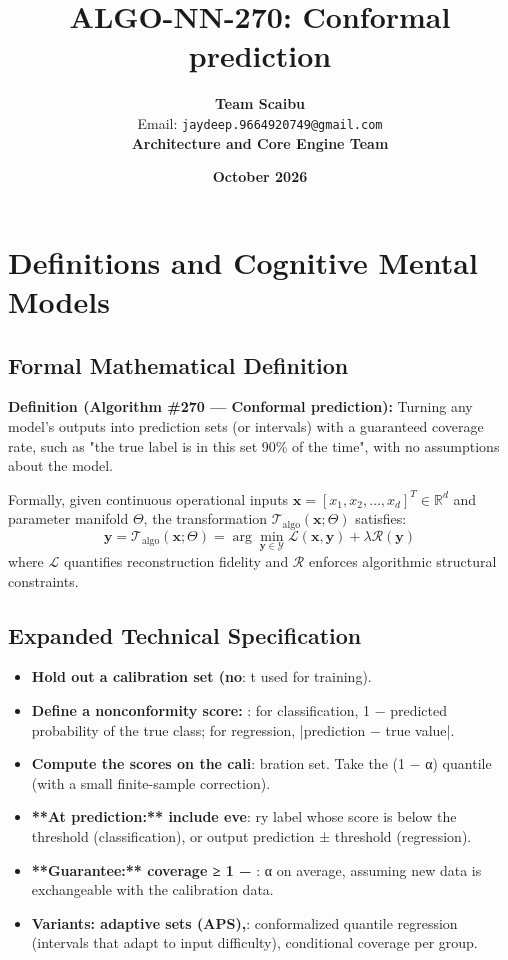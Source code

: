 \documentclass[11pt,a4paper]{article}
\title{\textbf{ALGO-NN-270: Conformal prediction}}
\author{\textbf{Team Scaibu} \\ \small Email: \texttt{jaydeep.9664920749@gmail.com} \\ \small \textbf{Architecture and Core Engine Team}}
\date{\textbf{October 2026}}
\theoremstyle{definition}
\begin{document}
\maketitle

\section{Definitions and Cognitive Mental Models}

\subsection{Formal Mathematical Definition}
\textbf{Definition (Algorithm \#270 --- Conformal prediction):}
Turning any model's outputs into prediction sets (or intervals) with a guaranteed coverage rate, such as "the true label is in this set 90\% of the time", with no assumptions about the model.

Formally, given continuous operational inputs $\mathbf{x} = [x_1, x_2, \dots, x_d]^T \in \mathbb{R}^d$ and parameter manifold $\Theta$, the transformation $\mathcal{T}_{\text{algo}}(\mathbf{x}; \Theta)$ satisfies:
{\boldmath
\begin{equation}
\mathbf{y} = \mathcal{T}_{\text{algo}}(\mathbf{x}; \Theta) = \arg\min_{\mathbf{y} \in \mathcal{Y}} \mathcal{L}(\mathbf{x}, \mathbf{y}) + \lambda \mathcal{R}(\mathbf{y})
\end{equation}
}
where $\mathcal{L}$ quantifies reconstruction fidelity and $\mathcal{R}$ enforces algorithmic structural constraints.

\subsection{Expanded Technical Specification}
\begin{itemize}
\item \textbf{Hold out a calibration set (no}: t used for training).
\item \textbf{Define a nonconformity score: }: for classification, 1 − predicted probability of the true class; for regression, |prediction − true value|.
\item \textbf{Compute the scores on the cali}: bration set. Take the (1 − α) quantile (with a small finite-sample correction).
\item \textbf{**At prediction:** include eve}: ry label whose score is below the threshold (classification), or output prediction ± threshold (regression).
\item \textbf{**Guarantee:** coverage ≥ 1 − }: α on average, assuming new data is exchangeable with the calibration data.
\item \textbf{Variants: adaptive sets (APS),}:  conformalized quantile regression (intervals that adapt to input difficulty), conditional coverage per group.
\end{itemize}
\end{document}
